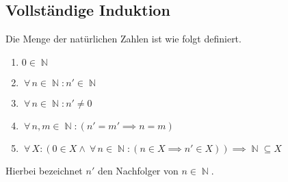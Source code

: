 \documentclass[a4paper,12pt]{article}
\DeclareMathOperator{\N}{\mathbb N}
\theoremstyle{definition}
\let\oldforall\forall
\renewcommand{\forall}{\:\oldforall \, }
\begin{document}
	\setcounter{section}{1}
	\setcounter{subsection}{7}
	\subsection{Vollständige Induktion}
	Die Menge der natürlichen Zahlen ist wie folgt definiert.
	\begin{enumerate}[label=(\arabic*)]
		\item $0 \in \N$
		\item $\forall n \in \N: n' \in \N$
		\item $\forall n \in \N: n' \neq 0$
		\item $\forall n, m \in \N: (n' = m' \implies n = m)$
		\item $\forall X: (0 \in X \land \forall n \in \N: (n \in X \implies n' \in X)) \implies \N \subseteq X$
	\end{enumerate}
	Hierbei bezeichnet $n'$ den Nachfolger von $n\in \N$.
	
\end{document}
